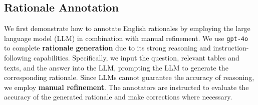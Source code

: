 \subsection{Rationale Annotation}
\label{subsec:Rationale Annotation}
We first demonstrate how to annotate English rationales by employing the large language model (LLM) in combination with manual refinement. 
We use \texttt{gpt-4o}~\cite{openai2024gpt4technicalreport} to complete \textbf{rationale generation} due to its strong reasoning and instruction-following capabilities. 
Specifically, we input the question, relevant tables and texts, and the answer into the LLM, prompting the LLM to generate the corresponding rationale.
Since LLMs cannot guarantee the accuracy of reasoning, we employ \textbf{manual refinement}. 
The annotators are instructed to evaluate the accuracy of the generated rationale and make corrections where necessary.

